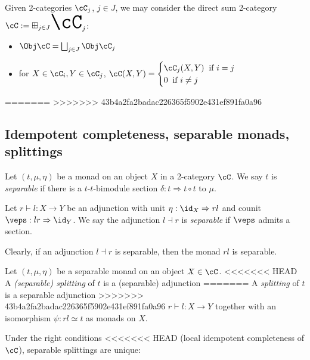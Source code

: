 \documentclass[12pt]{article}
\newcommand{\bigboxplus}{\Huge \boxplus}%
\begin{document}
\begin{definition}
Given 2-categories $\cC_j$, $j \in J$,
we may consider the direct sum 2-category
$\cC := \bigboxplus_{j \in J} \cC_j$:
\begin{itemize}
\item $\Obj \cC = \bigsqcup_{j \in J} \Obj \cC_j$

\item for $X \in \cC_i, Y \in \cC_j$,
	$\cC(X,Y) =
\begin{cases}
	\cC_j(X,Y) \;\; \text{if } i = j
	\\
	0 \;\; \text{if } i \neq j
\end{cases}
$
\end{itemize}
\end{definition}

=======
>>>>>>> 43b4a2fa2badac226365f5902e431ef891fa0a96
\subsection{Idempotent completeness, separable monads, splittings}

\begin{definition}
Let $(t, \mu, \eta)$ be a monad on an object $X$
in a 2-category $\cC$.
We say $t$ is \emph{separable} if there is a
$t$-$t$-bimodule section
$\delta: t \Rightarrow t \circ t$ to $\mu$.
\end{definition}

\begin{definition}
Let $r \vdash l: X \to Y$ be an adjunction
with unit $\eta: \id_X \Rightarrow rl$
and counit $\veps: lr \Rightarrow \id_Y$.
We say the adjunction $l \dashv r$ is \emph{separable}
if $\veps$ admits a section.
\end{definition}

Clearly, if an adjunction $l \dashv r$ is separable,
then the monad $rl$ is separable.

\begin{definition}
Let $(t,\mu,\eta)$ be a separable monad on
an object $X \in \cC$.
<<<<<<< HEAD
A \emph{(separable) splitting} of $t$ is a (separable) adjunction
=======
A \emph{splitting} of $t$ is a separable adjunction
>>>>>>> 43b4a2fa2badac226365f5902e431ef891fa0a96
$r \vdash l: X \to Y$
together with an isomorphism
$\psi: rl \simeq t$ as monads on $X$.
\end{definition}

Under the right conditions
<<<<<<< HEAD
(local idempotent completeness of $\cC$),
separable splittings are unique:
\end{document}
